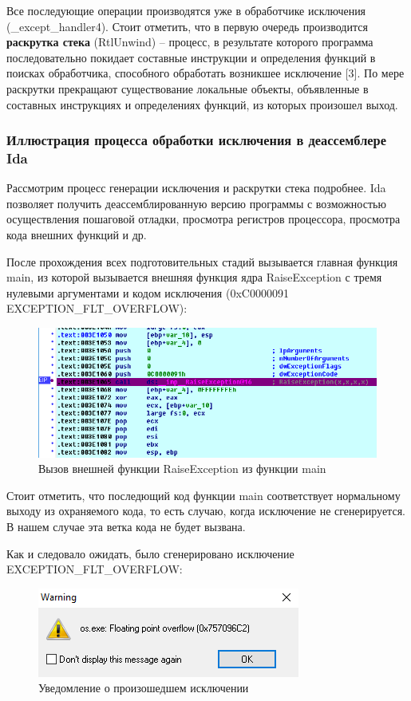 \documentclass[14pt,a4paper,report]{report}
\begin{document}
Все последующие операции производятся уже в обработчике исключения (\_except\_handler4). Стоит отметить, что в первую очередь производится \textbf{раскрутка стека} (RtlUnwind) -- процесс, в результате которого программа последовательно покидает составные инструкции и определения функций в поисках обработчика, способного обработать возникшее исключение [3]. По мере раскрутки прекращают существование локальные объекты, объявленные в составных инструкциях и определениях функций, из которых произошел выход.

\subsubsection{Иллюстрация процесса обработки исключения в деассемблере Ida}

Рассмотрим процесс генерации исключения и раскрутки стека подробнее. Ida позволяет получить деассемблированную версию программы с возможностью осуществления пошаговой отладки, просмотра регистров процессора, просмотра кода внешних функций и др. 

После прохождения всех подготовительных стадий вызывается главная функция main, из которой вызывается внешняя функция ядра RaiseException с тремя нулевыми аргументами и кодом исключения (0xC0000091 EXCEPTION\_FLT\_OVERFLOW):

\begin{figure}[h!]
	\centering
	\includegraphics[scale = 0.85]{images/1_d1.png}
	\caption{Вызов внешней функции RaiseException из функции main}
\end{figure}

Стоит отметить, что последющий код функции main соответствует нормальному выходу из охраняемого кода, то есть случаю, когда исключение не сгенерируется. В нашем случае эта ветка кода не будет вызвана.

Как и следовало ожидать, было сгенерировано исключение EXCEPTION\_FLT\_OVERFLOW:

\begin{figure}[h!]
	\centering
	\includegraphics[scale = 0.69]{images/1_d2.png}
	\caption{Уведомление о произошедшем исключении}
\end{figure}
\end{document}
